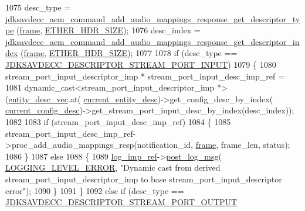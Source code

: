 \begin{DoxyCode}
{{1075         desc\_type = 
      \hyperlink{group__command__add__audio__mappings__response_ga608374a64878861178106de48db53a1d}{jdksavdecc\_aem\_command\_add\_audio\_mappings\_response\_get\_descriptor\_type}
      (\hyperlink{gst__avb__playbin_8c_ac8e710e0b5e994c0545d75d69868c6f0}{frame}, \hyperlink{namespaceavdecc__lib_a6c827b1a0d973e18119c5e3da518e65ca9512ad9b34302ba7048d88197e0a2dc0}{ETHER\_HDR\_SIZE});
1076         desc\_index = 
      \hyperlink{group__command__add__audio__mappings__response_ga76045e388d5d0ff951b2a1e991196c01}{jdksavdecc\_aem\_command\_add\_audio\_mappings\_response\_get\_descriptor\_index}
      (\hyperlink{gst__avb__playbin_8c_ac8e710e0b5e994c0545d75d69868c6f0}{frame}, \hyperlink{namespaceavdecc__lib_a6c827b1a0d973e18119c5e3da518e65ca9512ad9b34302ba7048d88197e0a2dc0}{ETHER\_HDR\_SIZE});
1077 
1078         \textcolor{keywordflow}{if} (desc\_type == \hyperlink{group__descriptor_gabf97c9389e49a8c27f2192854f830eda}{JDKSAVDECC\_DESCRIPTOR\_STREAM\_PORT\_INPUT})
1079         \{
1080             stream\_port\_input\_descriptor\_imp * stream\_port\_input\_desc\_imp\_ref =
1081                 \textcolor{keyword}{dynamic\_cast<}stream\_port\_input\_descriptor\_imp *\textcolor{keyword}{>}(\hyperlink{classavdecc__lib_1_1end__station__imp_a72edab41bc56e3c1757944a7df188a3d}{entity\_desc\_vec}.at(
      \hyperlink{classavdecc__lib_1_1end__station__imp_afd78c89df26ba7641e1adb764c0e827d}{current\_entity\_desc})->get\_config\_desc\_by\_index(
      \hyperlink{classavdecc__lib_1_1end__station__imp_a60b1af40d35e8a86b0082c54ab6cb6a8}{current\_config\_desc})->get\_stream\_port\_input\_desc\_by\_index(desc\_index));
1082 
1083             \textcolor{keywordflow}{if} (stream\_port\_input\_desc\_imp\_ref)
1084             \{
1085                 stream\_port\_input\_desc\_imp\_ref->proc\_add\_audio\_mappings\_resp(notification\_id, 
      \hyperlink{gst__avb__playbin_8c_ac8e710e0b5e994c0545d75d69868c6f0}{frame}, frame\_len, status);
1086             \}
1087             \textcolor{keywordflow}{else}
1088             \{
1089                 \hyperlink{namespaceavdecc__lib_acbe3e2a96ae6524943ca532c87a28529}{log\_imp\_ref}->\hyperlink{classavdecc__lib_1_1log_a68139a6297697e4ccebf36ccfd02e44a}{post\_log\_msg}(
      \hyperlink{namespaceavdecc__lib_a501055c431e6872ef46f252ad13f85cdaf2c4481208273451a6f5c7bb9770ec8a}{LOGGING\_LEVEL\_ERROR}, \textcolor{stringliteral}{"Dynamic cast from derived stream\_port\_input\_descriptor\_imp to base
       stream\_port\_input\_descriptor error"});
1090             \}
1091         \}
1092         \textcolor{keywordflow}{else} \textcolor{keywordflow}{if} (desc\_type == \hyperlink{group__descriptor_gab28f87a9e7610f8441c1c4840d2c2fb9}{JDKSAVDECC\_DESCRIPTOR\_STREAM\_PORT\_OUTPUT}
}}
\end{DoxyCode}
